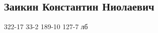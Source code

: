 \documentclass[a4paper,12pt]{report}
\begin{document}
	\def \nocredits {}
	\def \LineE {Конспект по дисциплине}
	\def \LineF {WEB-технология}

	\maketitle


\subsection*{Заикин Константин Ниолаевич}
322-17
33-2
189-10
127-7 лб
\end{document}
